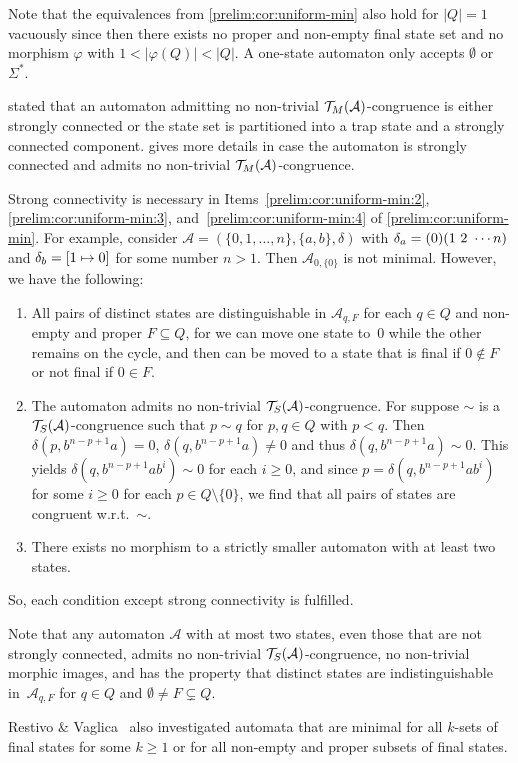 Note that the equivalences from \cref{prelim:cor:uniform-min} 
also hold for $|Q| = 1$ vacuously since then there exists no
proper and non-empty final state set and no morphism $\varphi$
with $1 < |\varphi(Q)| < |Q|$. A one-state automaton
only accepts $\emptyset$ or $\Sigma^*$.

 stated that an automaton admitting no non-trivial $\mathcal T_M(\mathcal A)$-congruence
is either strongly connected or the state set is partitioned into a trap state and a strongly connected component.
 gives more details in case the automaton is strongly connected
and admits no non-trivial $\mathcal T_M(\mathcal A)$-congruence.

\begin{remark}
	Strong connectivity is necessary in Items~\ref{prelim:cor:uniform-min:2},\ref{prelim:cor:uniform-min:3},
	and~\ref{prelim:cor:uniform-min:4} of \cref{prelim:cor:uniform-min}.
	For example, consider $\mathcal A = (\{0,1,\ldots,n\}, \{a,b\}, \delta)$
	with ${\delta}_{a} = (0)(1 ~ 2 ~ \cdots n)$
	and ${\delta}_{b} = [1 \mapsto 0]$ for some number $n > 1$. 
	Then $\mathcal A_{0, \{0\}}$ is not minimal.
	However, we have the following:
	
	\begin{enumerate}
	\item All pairs of distinct states are distinguishable
	in $\mathcal A_{q,F}$ for each $q \in Q$
	and non-empty and proper $F \subseteq Q$,
	for we can move one state to~$0$ while the other remains on the cycle, and
	then can be moved to a state that is final if $0 \notin F$
	or not final if $0 \in F$.
		
	\item The automaton admits no non-trivial $\mathcal T_S(\mathcal A)$-congruence.
	For suppose $\sim$ is a $\mathcal T_S(\mathcal A)$-congruence
	such that $p \sim q$ for $p,q \in Q$ with $p < q$.
	Then $\delta(p, b^{n - p + 1}a) = 0$, $\delta(q, b^{n - p + 1}a) \ne 0$
	and thus $\delta(q, b^{n - p + 1}a) \sim 0$.
	This yields $\delta(q, b^{n - p + 1}a b^i ) \sim 0$ for each $i \ge 0$,
	and since $p = \delta(q, b^{n - p + 1}a b^i )$ for some $i \ge 0$
	for each $p \in Q \setminus \{0\}$,
	we find that all pairs of states are congruent w.r.t.~$\sim$.
	
	\item There exists no morphism to a strictly smaller automaton
	with at least two states.	
	\end{enumerate}
	So, each condition except strong connectivity is fulfilled.
\end{remark}

Note that any automaton $\mathcal A$ with at most two states, even those that are not strongly connected,
admits no non-trivial $\mathcal T_S(\mathcal A)$-congruence, no non-trivial morphic images,
and has the property that distinct states are indistinguishable in~$\mathcal A_{q,F}$ for $q \in Q$ and $\emptyset \ne F \subsetneq Q$.

Restivo \& Vaglica~\cite{DBLP:journals/tcs/RestivoV12,DBLP:journals/tcs/RestivoV12a}
also investigated automata that are minimal for all $k$-sets of final states for some $k \ge 1$
or for all non-empty and proper subsets of final states.
